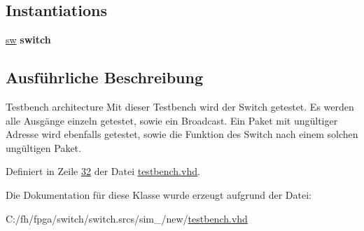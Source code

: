 \subsection*{Instantiations}
 \begin{DoxyCompactItemize}
\item 
\mbox{\label{classtestbench_1_1testbench_aa7080d83399ba6d9a1d5f4ac0034a110}} 
\mbox{\hyperlink{classtestbench_1_1testbench_aa7080d83399ba6d9a1d5f4ac0034a110}{sw}}  {\bfseries switch}   
\end{DoxyCompactItemize}


\subsection{Ausführliche Beschreibung}
Testbench architecture Mit dieser Testbench wird der Switch getestet. Es werden alle Ausgänge einzeln getestet, sowie ein Broadcast. Ein Paket mit ungültiger Adresse wird ebenfalls getestet, sowie die Funktion des Switch nach einem solchen ungültigen Paket. 

Definiert in Zeile \mbox{\hyperlink{testbench_8vhd_source_l00032}{32}} der Datei \mbox{\hyperlink{testbench_8vhd_source}{testbench.\+vhd}}.



Die Dokumentation für diese Klasse wurde erzeugt aufgrund der Datei\+:\begin{DoxyCompactItemize}
\item 
C\+:/fh/fpga/switch/switch.\+srcs/sim\+\_/new/\mbox{\hyperlink{testbench_8vhd}{testbench.\+vhd}}\end{DoxyCompactItemize}
